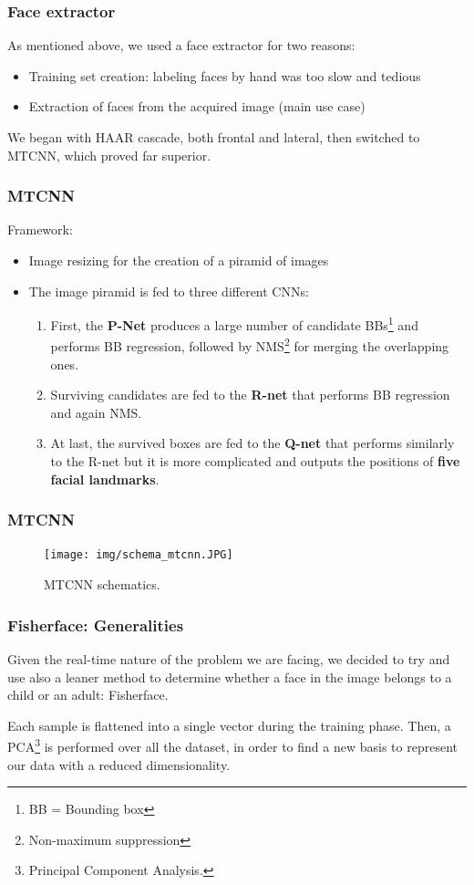 \documentclass{beamer}
\begin{document}
	\begin{frame}
		\frametitle{Face extractor}
		As mentioned above, we used a face extractor for two reasons:
		\begin{itemize}
			\item Training set creation: labeling faces by hand was too slow and tedious
			\item Extraction of faces from the acquired image (main use case)
		\end{itemize}
		We began with HAAR cascade, both frontal and lateral, then switched to MTCNN, which proved far superior.
	\end{frame}
	
	\begin{frame}
		\frametitle{MTCNN}
		Framework:
		\begin{itemize}
			\item Image resizing for the creation of a piramid of images
			\item The image piramid is fed to three different CNNs:
			\begin{enumerate}
				\item First, the \textbf{P-Net} produces a large number of candidate BBs\footnote{BB = Bounding box} and performs BB regression, followed by NMS\footnote{Non-maximum suppression} for merging the overlapping ones.
				\item Surviving candidates are fed to the \textbf{R-net} that performs BB regression and again NMS.
				\item At last, the survived boxes are fed to the \textbf{Q-net} that performs similarly to the R-net but it is more complicated and outputs the positions of \textbf{five facial landmarks}.
			\end{enumerate}
		\end{itemize}
	\end{frame}
	
	\begin{frame}
		\frametitle{MTCNN}
		\begin{figure}
			\centering
			\texttt{[image: img/schema\_mtcnn.JPG]}
    		\caption{MTCNN schematics.}
    		\label{fig:schema_mtcnn}
		\end{figure}
	\end{frame}
	
	\begin{frame}
		\frametitle{Fisherface: Generalities}
		Given the real-time nature of the problem we are facing, we decided to try and use also a leaner method to determine whether a face in the image belongs to a child or an adult: Fisherface.
		
		\bigskip
		
		Each sample is flattened into a single vector during the training phase. Then, a PCA\footnote{Principal Component Analysis.} is performed over all the dataset, in order to find a new basis to represent our data with a reduced dimensionality\footfullcite{Belhumeur1997}.
		 
	\end{frame}
	
\end{document}
